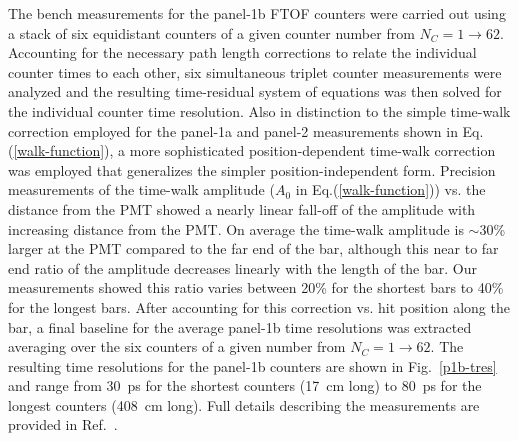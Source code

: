 \documentclass[3p,times,twocolumn]{elsarticle}
\begin{document}
The bench measurements for the panel-1b FTOF counters were carried out using a stack of six
equidistant counters of a given counter number from $N_C = 1 \to 62$. Accounting for the
necessary path length corrections to relate the individual counter times to each other, six simultaneous
triplet counter measurements were analyzed and the resulting time-residual system of equations was then
solved for the individual counter time resolution. Also in distinction to the simple time-walk correction
employed for the panel-1a and panel-2 measurements shown in Eq.(\ref{walk-function}), a more sophisticated
position-dependent time-walk correction was employed that generalizes the simpler position-independent form.
Precision measurements of the time-walk amplitude ($A_0$ in Eq.(\ref{walk-function})) vs. the distance from
the PMT showed a nearly linear fall-off of the amplitude with increasing distance from the PMT. On average
the time-walk amplitude is $\sim$30\% larger at the PMT compared to the far end of the bar, although this
near to far end ratio of the amplitude decreases linearly with the length of the bar. Our measurements
showed this ratio varies between 20\% for the shortest bars to 40\% for the longest bars. After accounting
for this correction vs. hit position along the bar, a final baseline for the average panel-1b time resolutions was
extracted averaging over the six counters of a given number from $N_C = 1 \to 62$. The resulting time
resolutions for the panel-1b counters are shown in Fig.~\ref{p1b-tres} and range from 30~ps for the shortest
counters  (17~cm long) to 80~ps for the longest counters (408~cm long). Full details describing the
measurements are provided in Ref.~\cite{nim-p1b}.
\end{document}
